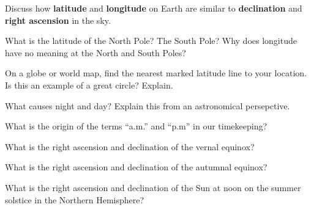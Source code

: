 \documentclass[addpoints]{exam}
\begin{document}
\begin{questions}








\question %
Discuss how \textbf{latitude} and \textbf{longitude} on Earth are similar to \textbf{declination} and \textbf{right ascension} in the sky.

\question %
What is the latitude of the North Pole? The South Pole? Why does longitude have no meaning at the North and South Poles?

\question %
On a globe or world map, find the nearest marked latitude line to your location. Is this an example of a great circle? Explain.

\question
What causes night and day? Explain this from an astronomical persepctive.

\question %
What is the origin of the terms ``a.m.'' and ``p.m'' in our timekeeping?

\question %
What is the right ascension and declination of the vernal equinox?

\question %
What is the right ascension and declination of the autumnal equinox?

\question %
What is the right ascension and declination of the Sun at noon on the summer solstice in the Northern Hemisphere?


\end{questions}
\end{document}
